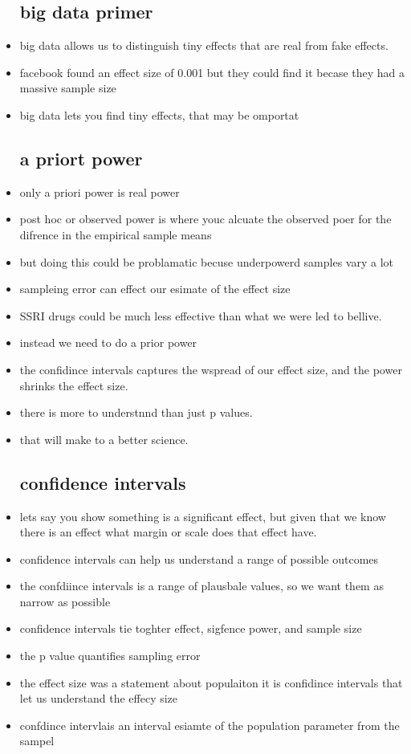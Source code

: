 \documentclass{article}
\begin{document}
\begin{itemize}
\subsection{big data primer}
\item big data allows us to distinguish tiny effects that are real from fake effects.
\item facebook found an effect size of 0.001 but they could find it becase they had a massive sample size
\item big data lets you find tiny effects, that may be omportat
\subsection{a priort power}
\item only a priori power is real power
\item post hoc or observed power is where youc alcuate the observed poer for the difrence in the empirical sample means 
\item but doing this could be problamatic becuse underpowerd samples vary a lot 
\item sampleing error can effect our esimate of the effect size
\item SSRI drugs could be much less effective than what we were led to bellive. 
\item instead we need to do a prior power 
\item the confidince intervals captures the wspread of our effect size, and the power shrinks the effect size. 
\item there is more to understnnd than just p values. 
\item that will make to a better science. 
\subsection{ confidence intervals }
\item lets say you show something is a significant effect, but given that we know there is an effect what margin or scale does that effect have. 
\item confidence intervals can help us understand a range of possible outcomes
\item the confdiince intervals is a range of plausbale values, so we want them as narrow as possible 
\item confidence intervals tie toghter effect, sigfence power, and sample size 
\item the p value quantifies sampling error  
\item the effect size was a statement about populaiton it is confidince intervals that let us understand the effecy size 
\item confdince intervlais an interval esiamte of the population parameter from the sampel

\end{itemize}
\end{document}
